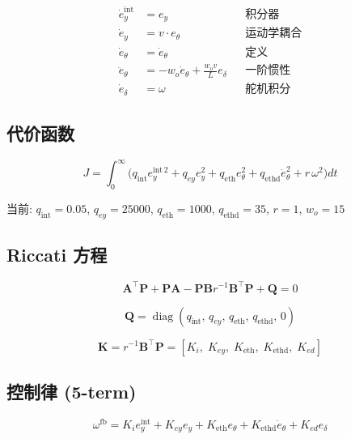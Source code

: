 \documentclass[11pt,a4paper]{article}
\begin{document}
\begin{align}
\dot{e}_y^{\text{int}} &= e_y &&\text{积分器} \\
\dot{e}_y              &= v \cdot e_\theta &&\text{运动学耦合} \\
\dot{e}_\theta         &= \dot{e}_\theta &&\text{定义} \\
\ddot{e}_\theta        &= -w_o \dot{e}_\theta + \frac{w_o v}{L} e_\delta &&\text{一阶惯性} \\
\dot{e}_\delta         &= \omega &&\text{舵机积分}
\end{align}

\subsection{代价函数}

\begin{equation}
\boxed{
J = \int_0^\infty \big(
q_{\text{int}} e_y^{\text{int}\,2}
+ q_{ey} e_y^2
+ q_{\text{eth}} e_\theta^2
+ q_{\text{ethd}} \dot{e}_\theta^2
+ r\,\omega^2
\big) dt
}
\end{equation}

当前: $q_{\text{int}} = 0.05$, $q_{ey} = 25000$, $q_{\text{eth}} = 1000$, $q_{\text{ethd}} = 35$, $r = 1$, $w_o = 15$

\subsection{Riccati 方程}

\begin{equation}
\boxed{
\mathbf{A}^\top \mathbf{P} + \mathbf{P}\mathbf{A} - \mathbf{P}\mathbf{B}r^{-1}\mathbf{B}^\top\mathbf{P} + \mathbf{Q} = 0
}
\end{equation}

\begin{equation}
\mathbf{Q} = \operatorname{diag}(q_{\text{int}},\, q_{ey},\, q_{\text{eth}},\, q_{\text{ethd}},\, 0)
\end{equation}

\begin{equation}
\mathbf{K} = r^{-1}\mathbf{B}^\top\mathbf{P} = [K_i,\; K_{ey},\; K_{\text{eth}},\; K_{\text{ethd}},\; K_{ed}]
\end{equation}

\subsection{控制律 (5-term)}

\begin{equation}
\boxed{
\omega^{\text{fb}} = K_i e_y^{\text{int}}
+ K_{ey} e_y
+ K_{\text{eth}} e_\theta
+ K_{\text{ethd}} \dot{e}_\theta
+ K_{ed} e_\delta
}
\end{equation}
\end{document}
